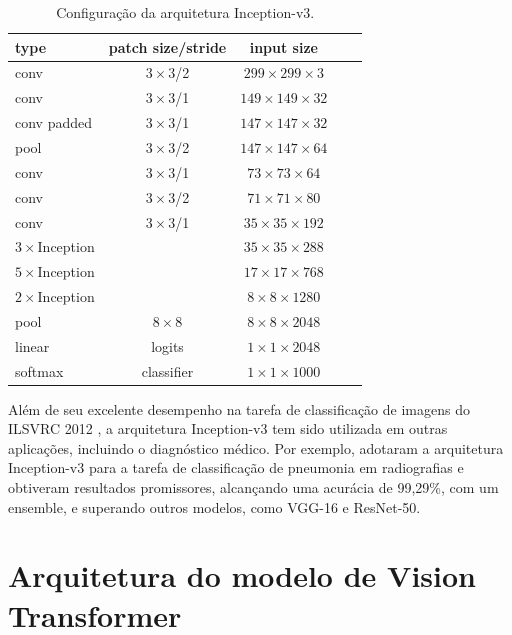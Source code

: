 \begin{table}[ht]
    \centering
    \footnotesize
    \begin{tabular}{|l|c|c|c|c|}
        \hline
        \textbf{type} & \textbf{patch size/stride} & \textbf{input size} \\
        \hline
        conv & $3\times3$/2 & $299\times299\times3$ \\
        \hline
        conv & $3\times3$/1 & $149\times149\times32$ \\
        \hline
        conv padded & $3\times3$/1 & $147\times147\times32$ \\
        \hline
        pool & $3\times3$/2 & $147\times147\times64$ \\
        \hline
        conv & $3\times3$/1 & $73\times73\times64$ \\
        \hline
        conv & $3\times3$/2 & $71\times71\times80$ \\
        \hline
        conv & $3\times3$/1 & $35\times35\times192$ \\
        \hline
        $3\times$Inception &  & $35\times35\times288$ \\
        \hline
        $5\times$Inception &  & $17\times17\times768$ \\
        \hline
        $2\times$Inception &  & $8\times8\times1280$ \\
        \hline
        pool & $8\times8$ & $8\times8\times2048$ \\
        \hline
        linear & logits & $1\times1\times2048$ \\
        \hline
        softmax & classifier & $1\times1\times1000$ \\
        \hline
    \end{tabular}
    \caption{Configuração da arquitetura Inception-v3.}
    \label{inception-v3-arch}
\end{table}

Além de seu excelente desempenho na tarefa de classificação de imagens do ILSVRC 2012 \citep{Russakovsky2015}, a arquitetura Inception-v3 tem sido utilizada em outras aplicações, incluindo o diagnóstico médico. Por exemplo, \cite{Mujahid2022} adotaram a arquitetura Inception-v3 para a tarefa de classificação de pneumonia em radiografias e obtiveram resultados promissores, alcançando uma acurácia de 99,29\%, com um ensemble, e superando outros modelos, como VGG-16 e ResNet-50.

\section{Arquitetura do modelo de Vision Transformer}

